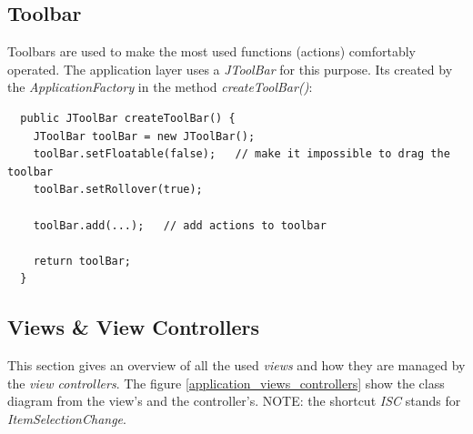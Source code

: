 \subsection{Toolbar}
Toolbars are used to make the most used functions (actions) comfortably operated. The application layer uses a \textit{JToolBar} for this purpose. Its created by the \textit{ApplicationFactory} in the method \textit{createToolBar()}:
\begin{verbatim}
  public JToolBar createToolBar() {
    JToolBar toolBar = new JToolBar();
    toolBar.setFloatable(false);   // make it impossible to drag the toolbar
    toolBar.setRollover(true);

    toolBar.add(...);   // add actions to toolbar

    return toolBar;
  }
\end{verbatim}

\subsection{Views \& View Controllers}
This section gives an overview of all the used \textit{views} and how they are managed by the \textit{view controllers}. The figure \ref{application_views_controllers} show the class diagram from the view's and the controller's. NOTE: the shortcut \textit{ISC} stands for \textit{ItemSelectionChange}.
